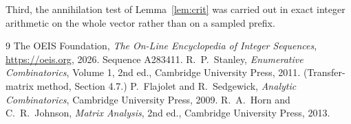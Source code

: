 \documentclass[11pt,a4paper]{article}
\theoremstyle{plain}
\theoremstyle{definition}
\begin{document}
Third, the annihilation test of Lemma~\ref{lem:crit} was carried out in exact integer
arithmetic on the whole vector rather than on a sampled prefix.

\begin{thebibliography}{9}
 The OEIS Foundation, \emph{The On-Line Encyclopedia of Integer
Sequences}, \url{https://oeis.org}, 2026. Sequence A283411.
 R.~P.~Stanley, \emph{Enumerative Combinatorics}, Volume 1, 2nd ed.,
Cambridge University Press, 2011. (Transfer-matrix method, Section 4.7.)
 P.~Flajolet and R.~Sedgewick, \emph{Analytic Combinatorics}, Cambridge
University Press, 2009.
 R.~A.~Horn and C.~R.~Johnson, \emph{Matrix Analysis}, 2nd ed., Cambridge
University Press, 2013.
\end{thebibliography}
\end{document}
